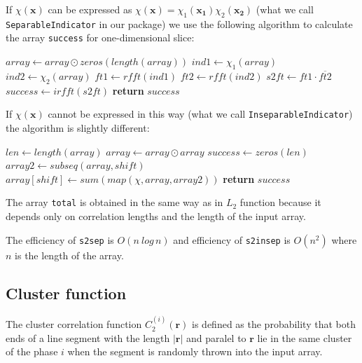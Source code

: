 \documentclass[reprint,amsmath,amssymb,aps,pre]{revtex4-1}
\newcommand{\code}[1]{\colorbox{light-gray}{\texttt{#1}}}
\begin{document}
If $\chi(\bm{x})$ can be expressed as
$\chi(\bm{x}) = \chi_1(\bm{x_1})\chi_2(\bm{x_2})$ (what we call
\code{SeparableIndicator} in our package) we use the following algorithm to
calculate the array \code{success} for one-dimensional slice:
\begin{algorithmic}[1]
    \State $array \gets array \odot zeros(length(array))$ 
  \EndIf
  \State $ind1 \gets \chi_1(array)$ 
  \State $ind2 \gets \chi_2(array)$ 
  \State $ft1 \gets rfft(ind1)$ 
  \State $ft2 \gets rfft(ind2)$
  \State $s2ft \gets ft1 \cdot \overline{ft2}$ 
  \State $success \gets irfft(s2ft)$ 
  \State \textbf{return} $success$
  \EndProcedure
\end{algorithmic}

If $\chi(\bm{x})$ cannot be expressed in this way (what we call
\code{InseparableIndicator}) the algorithm is slightly different:
\begin{algorithmic}[1]
    \State $len \gets length(array)$
      \State $array \gets array \odot array$
    \EndIf
    \State $success \gets zeros(len)$
      \State $array2 \gets subseq(array, shift)$
      \State $array[shift] \gets sum(map(\chi, array, array2))$
    \EndFor
    \State \textbf{return} $success$
  \EndProcedure
\end{algorithmic}

The array \code{total} is obtained in the same way as in $L_2$ function because
it depends only on correlation lengths and the length of the input array.

The efficiency of \code{s2sep} is $O(n\:log\,n)$ and efficiency of
\code{s2insep} is $O(n^2)$ where $n$ is the length of the array.

\subsection{Cluster function}
The cluster correlation function $C_2^{(i)}(\bm{r})$ is defined as the
probability that both ends of a line segment with the length $|\bm{r}|$ and
paralel to $\bm{r}$ lie in the same cluster of the phase $i$ when the segment is
randomly thrown into the input array.
\end{document}

